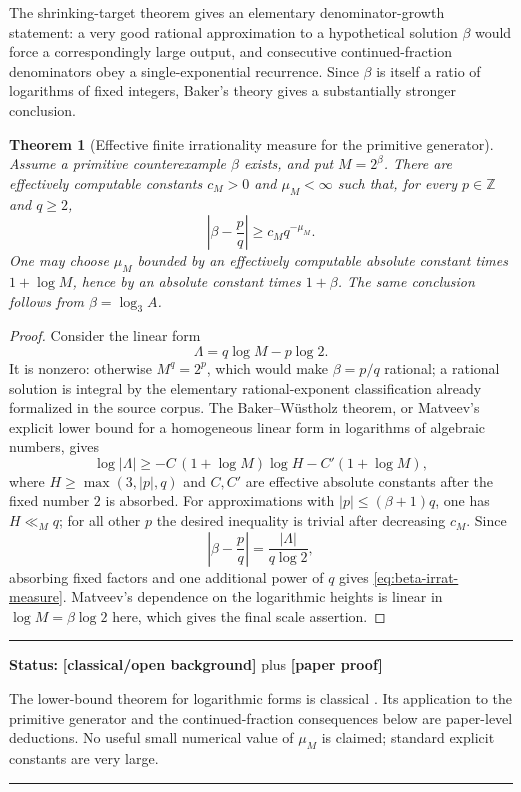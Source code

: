 \documentclass[11pt,oneside]{article}
\newtheorem{theorem}{Theorem}[section]
\theoremstyle{definition}
\theoremstyle{remark}
\newcommand{\Z}{\mathbb Z}
\newcommand{\statusnew}{\textcolor{newgreen}{\textbf{[paper proof]}}}
\newcommand{\statusknown}{\textcolor{classicalgray}{\textbf{[classical/open background]}}}
\newenvironment{statusbox}[1]
{\begin{center}\begin{minipage}{0.94\textwidth}\raggedright\hbadness=10000\hrule
\vspace{0.45em}\textbf{Status:} #1\par\vspace{0.35em}}
{\vspace{0.35em}\hrule\end{minipage}\end{center}}
\begin{document}
The shrinking-target theorem gives an elementary denominator-growth statement: a very good rational
approximation to a hypothetical solution $\beta$ would force a correspondingly large output,
and consecutive continued-fraction denominators obey a single-exponential recurrence.  Since
$\beta$ is itself a ratio of logarithms of fixed integers, Baker's theory gives a substantially
stronger conclusion.

\begin{theorem}[Effective finite irrationality measure for the primitive generator]
\label{thm:baker-beta}
Assume a primitive counterexample $\beta$ exists, and put $M=2^\beta$.  There are effectively
computable constants $c_M>0$ and $\mu_M<\infty$ such that, for every $p\in\Z$ and $q\ge2$,
\begin{equation}\label{eq:beta-irrat-measure}
  \left|\beta-\frac pq\right|\ge c_Mq^{-\mu_M}.
\end{equation}
One may choose $\mu_M$ bounded by an effectively computable absolute constant times
$1+\log M$, hence by an absolute constant times $1+\beta$.  The same conclusion follows from
$\beta=\log_3 A$.
\end{theorem}

\begin{proof}
Consider the linear form
\[
  \Lambda=q\log M-p\log2.
\]
It is nonzero: otherwise $M^q=2^p$, which would make $\beta=p/q$ rational; a rational solution
is integral by the elementary rational-exponent classification already formalized in the
source corpus.  The Baker--W\"ustholz theorem, or Matveev's explicit lower bound for a
homogeneous linear form in logarithms of algebraic numbers, gives
\[
  \log|\Lambda|\ge-C\,(1+\log M)\log H-C'(1+\log M),
\]
where $H\ge\max(3,|p|,q)$ and $C,C'$ are effective absolute constants after the fixed number
$2$ is absorbed.  For approximations with $|p|\le(\beta+1)q$, one has $H\ll_Mq$; for all other
$p$ the desired inequality is trivial after decreasing $c_M$.  Since
\[
  \left|\beta-\frac pq\right|=\frac{|\Lambda|}{q\log2},
\]
absorbing fixed factors and one additional power of $q$ gives
\eqref{eq:beta-irrat-measure}.  Matveev's dependence on the logarithmic heights is linear in
$\log M=\beta\log2$ here, which gives the final scale assertion.
\end{proof}

\begin{statusbox}{\statusknown{} plus \statusnew}
The lower-bound theorem for logarithmic forms is classical
\cite{Baker1975,BakerWustholz1993,Matveev2000}.  Its application to the primitive generator
and the continued-fraction consequences below are paper-level deductions.  No useful small
numerical value of $\mu_M$ is claimed;
standard explicit constants are very large.
\end{statusbox}
\end{document}
